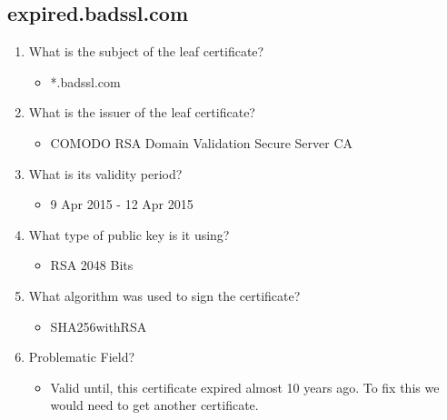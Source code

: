 \documentclass[11pt]{article}
\begin{document}
\subsection{expired.badssl.com}
\label{sec:org8a04477}
\begin{enumerate}
\item What is the subject of the leaf certificate?
\begin{itemize}
\item *.badssl.com
\end{itemize}
\item What is the issuer of the leaf certificate?
\begin{itemize}
\item COMODO RSA Domain Validation Secure Server CA
\end{itemize}
\item What is its validity period?
\begin{itemize}
\item 9 Apr 2015 - 12 Apr 2015
\end{itemize}
\item What type of public key is it using?
\begin{itemize}
\item RSA 2048 Bits
\end{itemize}
\item What algorithm was used to sign the certificate?
\begin{itemize}
\item SHA256withRSA
\end{itemize}
\item Problematic Field?
\begin{itemize}
\item Valid until, this certificate expired almost 10 years ago. To fix this we would need to get another certificate.
\end{itemize}
\end{enumerate}
\end{document}
